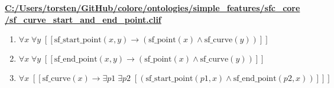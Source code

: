 \documentclass{article}
\begin{document}
\textbf{\url{C:/Users/torsten/GitHub/colore/ontologies/simple\_features/sfc\_core/sf\_curve\_start\_and\_end\_point.clif}}

\begin{enumerate}
\item $\forall x\; \forall y\;  \left[ \left[ \textrm{sf\_start\_point}(x,y) \rightarrow \left(\textrm{sf\_point}(x) \land \textrm{sf\_curve}(y)\right) \right] \right]$
\item $\forall x\; \forall y\;  \left[ \left[ \textrm{sf\_end\_point}(x,y) \rightarrow \left(\textrm{sf\_point}(x) \land \textrm{sf\_curve}(y)\right) \right] \right]$
\item $\forall x\;  \left[ \left[ \textrm{sf\_curve}(x) \rightarrow \exists p1\; \exists p2\;  \left[ \left(\textrm{sf\_start\_point}(p1,x) \land \textrm{sf\_end\_point}(p2,x)\right) \right] \right] \right]$
\end{enumerate}
\end{document}
